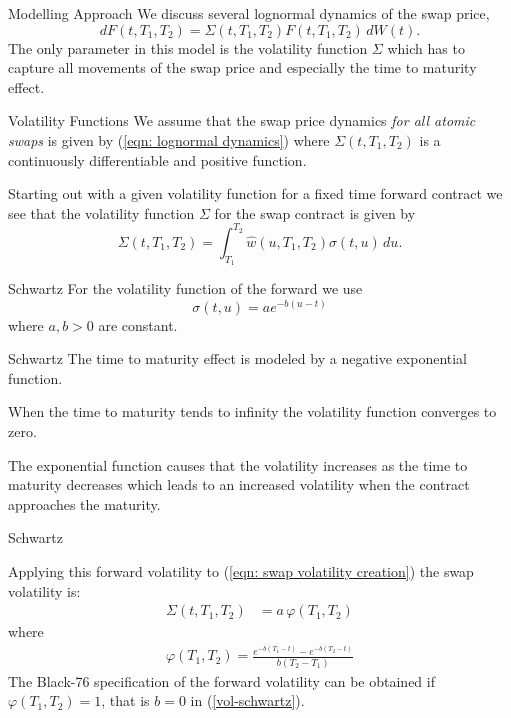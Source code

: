 {Modelling Approach}
We discuss several lognormal dynamics of the swap price,
\begin{equation}
dF(t,T_1,T_2)=\Sigma(t,T_1,T_2)F(t,T_1,T_2)\, dW(t). \label{eqn: lognormal dynamics}
\end{equation}
The only parameter in this model is the volatility function $\Sigma$ which has to capture all movements of the swap price and especially the time to maturity effect.

{Volatility Functions}
We assume that the swap price dynamics \emph{for all atomic swaps} is given by (\ref{eqn: lognormal dynamics})
where $\Sigma(t,T_1,T_2)$ is a continuously differentiable and positive function.

Starting out with a given volatility function for a fixed time forward contract we see that the volatility function $\Sigma$ for the swap contract is given by
\begin{equation}
\Sigma(t,T_1,T_2)=\int_{T_1}^{T_2} \hat{w}(u,T_1,T_2) \sigma(t,u) \, du. \label{eqn: swap volatility creation}
\end{equation}

{Schwartz}
For the volatility function of the forward we use
\begin{equation}\label{vol-schwartz}
\sigma(t,u)=a e^{-b(u-t)}
\end{equation}
where $a,b >0 $ are constant.

{Schwartz}
The time to maturity effect is modeled by a negative exponential function.


	When the time to maturity tends to infinity the volatility function converges to zero.

	The exponential function causes that the volatility increases as the time to maturity decreases which leads to an increased volatility when the contract approaches the maturity.


{Schwartz}

Applying this forward volatility to (\ref{eqn: swap volatility creation}) the swap volatility is:
\begin{align}
\Sigma(t,T_1,T_2)&=a\,\varphi(T_1,T_2)
\end{align}
where
\begin{align}
\varphi(T_1,T_2)= \frac{e^{-b(T_1-t)}-e^{-b(T_2-t)}}{b(T_2-T_1)}
\label{volatility function varphi}
\end{align}
The Black-76 specification of the forward volatility can be obtained if $\varphi(T_1,T_2) =1$, that is $b=0$
in (\ref{vol-schwartz}).

